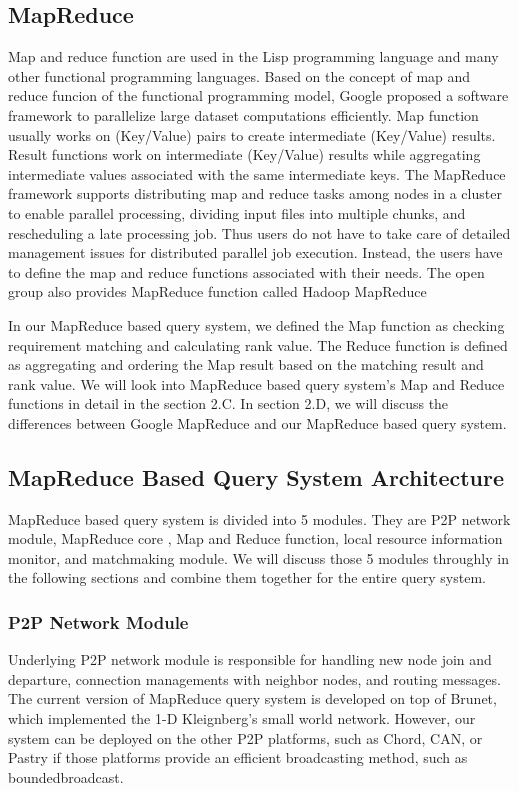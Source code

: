 \documentclass{acm_proc_article-sp}
\begin{document}
\subsection{MapReduce}
Map and reduce function are used in the Lisp programming language and many other functional programming languages. 
Based on the concept of map and reduce funcion of the functional programming model, Google proposed a software framework to parallelize large dataset computations efficiently\cite{google_mapreduce}.
Map function usually works on (Key/Value) pairs to create intermediate (Key/Value) results. 
Result functions work on intermediate (Key/Value) results while aggregating intermediate values associated with the same intermediate keys.
The MapReduce framework supports distributing map and reduce tasks among nodes in a cluster to enable parallel processing, dividing input files into multiple chunks,
and rescheduling a late processing job. Thus users do not have to take care of detailed management issues for distributed parallel job execution. Instead, the users have to define the 
map and reduce functions associated with their needs.
The open group also provides MapReduce function called Hadoop MapReduce\cite{hadoop}

In our MapReduce based query system, we defined the Map function as checking requirement matching and calculating rank value. The Reduce function is defined as 
aggregating and ordering the Map result based on the matching result and rank value. We will look into MapReduce based query system's Map and Reduce functions in detail in the section 2.C. 
In section 2.D, we will discuss the differences between Google MapReduce and our MapReduce based query system.

\subsection{MapReduce Based Query System Architecture}
MapReduce based query system is divided into 5 modules. They are P2P network module, MapReduce core , Map and Reduce function, local resource information monitor, and matchmaking module.
We will discuss those 5 modules throughly in the following sections and combine them together for the entire query system.
\subsubsection{P2P Network Module}
Underlying P2P network module is responsible for handling new node join and departure, connection managements with neighbor nodes, and routing messages. 
The current version of MapReduce query system is developed on top of Brunet\cite{brunet}, which implemented the 1-D Kleignberg's small world network\cite{small_world_network}.
However, our system can be deployed on the other P2P platforms, such as Chord\cite{chord}, CAN\cite{can}, or Pastry\cite{pastry} if those platforms
provide an efficient broadcasting method, such as boundedbroadcast. 
\end{document}
